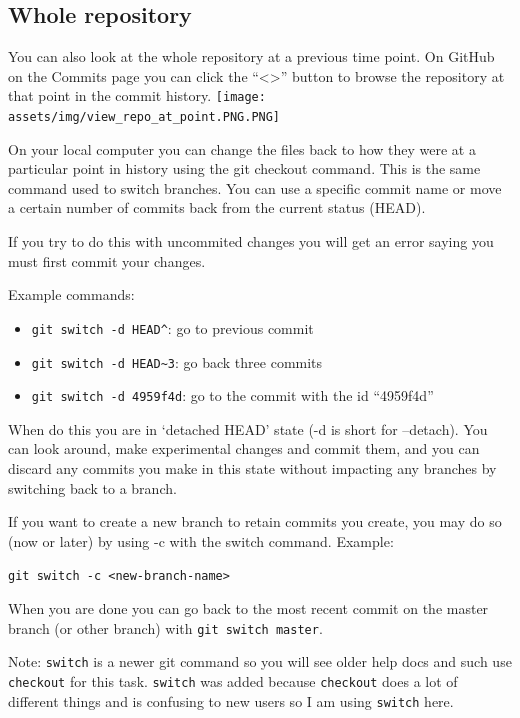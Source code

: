 \documentclass[
  letterpaper,
  DIV=11,
  numbers=noendperiod]{scrreprt}
\providecommand{\tightlist}{%
  \setlength{\itemsep}{0pt}\setlength{\parskip}{0pt}}\usepackage{longtable,booktabs,array}
\begin{document}
\hypertarget{whole-repository}{%
\subsection{Whole repository}\label{whole-repository}}

You can also look at the whole repository at a previous time point. On
GitHub on the Commits page you can click the ``\textless\textgreater{}''
button to browse the repository at that point in the commit history.
\texttt{[image: assets/img/view\_repo\_at\_point.PNG.PNG]}

On your local computer you can change the files back to how they were at
a particular point in history using the git checkout command. This is
the same command used to switch branches. You can use a specific commit
name or move a certain number of commits back from the current status
(HEAD).

If you try to do this with uncommited changes you will get an error
saying you must first commit your changes.

Example commands:

\begin{itemize}
\tightlist
\item
  \texttt{git\ switch\ -d\ HEAD\^{}}: go to previous commit
\item
  \texttt{git\ switch\ -d\ HEAD\textasciitilde{}3}: go back three
  commits
\item
  \texttt{git\ switch\ -d\ 4959f4d}: go to the commit with the id
  ``4959f4d''
\end{itemize}

When do this you are in `detached HEAD' state (-d is short for
--detach). You can look around, make experimental changes and commit
them, and you can discard any commits you make in this state without
impacting any branches by switching back to a branch.

If you want to create a new branch to retain commits you create, you may
do so (now or later) by using -c with the switch command. Example:

\texttt{git\ switch\ -c\ \textless{}new-branch-name\textgreater{}}

When you are done you can go back to the most recent commit on the
master branch (or other branch) with \texttt{git\ switch\ master}.

Note: \texttt{switch} is a newer git command so you will see older help
docs and such use \texttt{checkout} for this task. \texttt{switch} was
added because \texttt{checkout} does a lot of different things and is
confusing to new users so I am using \texttt{switch} here.
\end{document}
